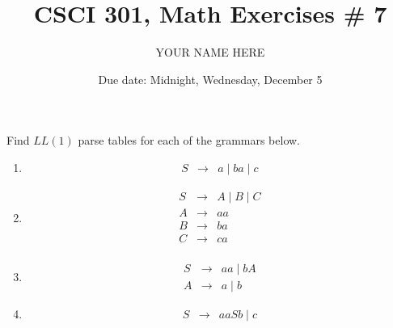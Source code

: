 \documentclass{article}
\title{CSCI 301, Math Exercises \# 7}
\author{YOUR NAME HERE}
\date{Due date:  Midnight, Wednesday, December 5}
\begin{document}
\maketitle


\noindent Find $LL(1)$ parse tables for each of the grammars 
below.
\begin{enumerate}
  
\item \label{llfirst}
  \begin{eqnarray*}
    S &\rightarrow& a \mid ba \mid c
  \end{eqnarray*}
\item
  \begin{eqnarray*}
    S &\rightarrow& A \mid B \mid C\\
    A &\rightarrow& aa\\
    B &\rightarrow& ba\\
    C &\rightarrow& ca\\
  \end{eqnarray*}
  
\item
  \begin{eqnarray*}
    S &\rightarrow& aa \mid bA\\
    A &\rightarrow& a \mid b
    \end{eqnarray*}

\item \label{lllast}
  \begin{eqnarray*}
    S &\rightarrow& aaSb \mid c
    \end{eqnarray*}


\end{enumerate}
\end{document}
